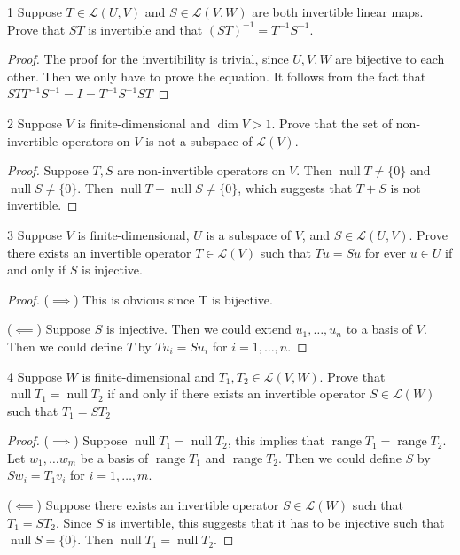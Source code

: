 \documentclass{article}
\newenvironment{problem}[1]{\begin{prob*}{#1}{}}{\end{prob*}}
\DeclareMathOperator{\Null}{null}
\DeclareMathOperator{\Range}{range}
\begin{document}
\begin{problem}{1}
Suppose $T \in \mathcal{L}(U,V)$ and $S \in \mathcal{L}(V,W)$ are both invertible linear maps. Prove that $ST$ is invertible and that \((ST)^{-1} = T^{-1}S^{-1}\).
\end{problem}
\begin{proof}
	The proof for the invertibility is trivial, since $U, V, W$ are bijective to each other. Then we only have to prove the equation.
	It follows from the fact that $ST T^{-1}S^{-1} = I = T^{-1}S^{-1} ST$
\end{proof}

\begin{problem}{2}
Suppose $V$ is finite-dimensional and $\operatorname{dim}V > 1$. Prove that the set of non-invertible operators on $V$ is not a subspace of $\mathcal{L}(V)$.
\end{problem}
\begin{proof}
	Suppose $T, S$ are non-invertible operators on $V$. Then $\Null T \neq \{0\}$ and $\Null S \neq \{0\}$. Then $\Null T + \Null S \neq \{0\}$, which suggests that $T + S$ is not invertible.
\end{proof}

\begin{problem}{3}
Suppose $V$ is finite-dimensional, $U $ is a subspace of $V$, and $S \in \mathcal{L}(U,V)$. Prove there exists an invertible operator $T \in \mathcal{L}(V)$ such that $Tu = Su$ for ever $u \in U$ if and only if $S$ is injective.
\end{problem}
\begin{proof}
	($\implies$) This is obvious since T is bijective.

	($\impliedby$) Suppose $S$ is injective. Then we could extend $u_1, \ldots , u_n$ to a basis of $V$. Then we could define $T$ by $Tu_i = Su_i$ for $i = 1, \ldots , n$.
\end{proof}

\begin{problem}{4}
Suppose $W$ is finite-dimensional and $T_1,T_2 \in \mathcal{L}(V,W)$. Prove that $\Null T_1 = \Null T_2$ if and only if there exists an invertible operator $S \in \mathcal{L}(W)$ such that $T_1 = ST_2$
\end{problem}
\begin{proof}
	($\implies$) Suppose $\Null T_1 = \Null T_2$, this implies that $\Range T_1 = \Range T_2$. Let $w_1, \ldots w_m$ be a basis of $\Range T_1$ and $\Range T_2$. Then we could define $S$ by $Sw_i = T_1v_i$ for $i = 1, \ldots , m$.

	($\impliedby$) Suppose there exists an invertible operator $S \in \mathcal{L}(W)$ such that $T_1 = ST_2$. Since $S$ is invertible, this suggests that it has to be injective such that $\Null S = \{0\}$. Then $\Null T_1 = \Null T_2$.
\end{proof}
\end{document}
